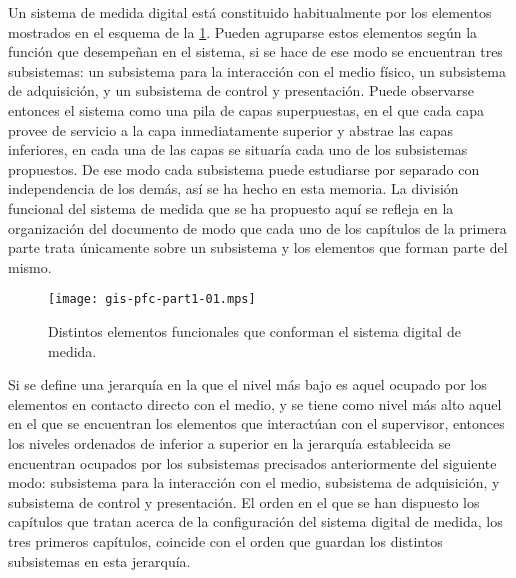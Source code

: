 Un sistema de medida digital está constituido habitualmente por los
elementos mostrados en el esquema de la \cref{fig:digmeasstm}. Pueden
agruparse estos elementos según la función que desempeñan en el sistema, si
se hace de ese modo se encuentran tres subsistemas: un subsistema para la
interacción con el medio físico, un subsistema de adquisición, y un
subsistema de control y presentación. Puede observarse entonces el sistema
como una pila de capas superpuestas, en el que cada capa provee de servicio
a la capa inmediatamente superior y abstrae las capas inferiores, en cada
una de las capas se situaría cada uno de los subsistemas propuestos. De ese
modo cada subsistema puede estudiarse por separado con independencia de los
demás, así se ha hecho en esta memoria. La división funcional del sistema
de medida que se ha propuesto aquí se refleja en la organización del
documento de modo que cada uno de los capítulos de la primera parte trata
únicamente sobre un subsistema y los elementos que forman parte del mismo.

\begin{figure}
	\begin{center}
		\texttt{[image: gis-pfc-part1-01.mps]}
	\end{center}
	\captionsetup{listformat=romanos, labelformat=romanos}
	\caption[Sistema de medida digital]{Distintos elementos funcionales
	que conforman el sistema digital de medida.}
	\label{fig:digmeasstm}
\end{figure}

\llongpage{}
Si se define una jerarquía en la que el nivel más bajo es aquel ocupado por
los elementos en contacto directo con el medio, y se tiene como nivel más
alto aquel en el que se encuentran los elementos que interactúan con el
supervisor, entonces los niveles ordenados de inferior a superior en la
jerarquía establecida se encuentran ocupados por los subsistemas precisados
anteriormente del siguiente modo: subsistema para la interacción con el
medio, subsistema de adquisición, y subsistema de control y presentación.
El orden en el que se han dispuesto los capítulos que tratan acerca de la
configuración del sistema digital de medida, los tres primeros capítulos,
coincide con el orden que guardan los distintos subsistemas en esta
jerarquía.
